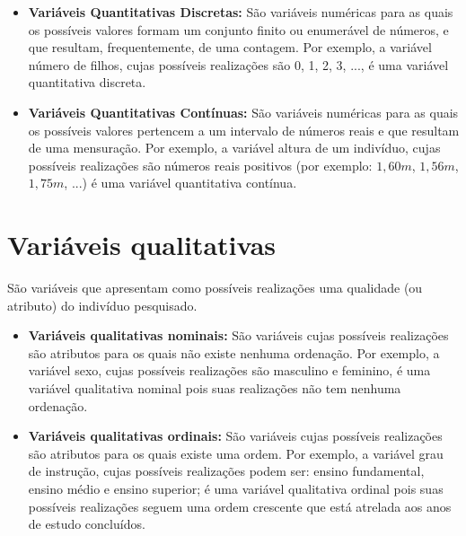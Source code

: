 \documentclass[11pt,fleqn]{book} %
\begin{document}
\begin{itemize}
	\item {\bf Variáveis Quantitativas Discretas:}
	São variáveis numéricas para as quais os possíveis valores formam um conjunto finito ou 
	enumerável de números, e que resultam, frequentemente, de uma contagem. Por exemplo, 
	a variável número de filhos, cujas possíveis realizações são 0, 1, 2, 3, $...$, é uma 
	variável quantitativa discreta.\\

	\item {\bf Variáveis Quantitativas Contínuas:}
	São variáveis numéricas para as quais os possíveis valores pertencem a um intervalo 
	de números reais e que resultam de uma mensuração. Por exemplo, a variável altura de 
	um indivíduo, cujas possíveis realizações são números reais positivos (por exemplo: 
	$1,60m$, $1,56m$, $1,75m$, $...$) é uma variável quantitativa contínua.\\
\end{itemize}


\section{Variáveis qualitativas}
São variáveis que apresentam como possíveis realizações uma qualidade (ou atributo) do indivíduo pesquisado.\\

\begin{itemize}
	\item {\bf Variáveis qualitativas nominais:} 
	São variáveis cujas possíveis realizações são atributos para os quais não existe nenhuma 
	ordenação. Por exemplo, a variável sexo, cujas possíveis realizações são masculino e 
	feminino, é uma variável qualitativa nominal pois suas realizações não tem nenhuma ordenação.\\

	\item {\bf Variáveis qualitativas ordinais:}
	São variáveis cujas possíveis realizações são atributos para os quais existe uma ordem. 
	Por exemplo, a variável grau de instrução, cujas possíveis realizações podem ser: ensino 
	fundamental, ensino médio e ensino superior; é uma variável qualitativa ordinal pois suas 
	possíveis realizações seguem uma ordem crescente que está atrelada aos anos de estudo concluídos.\\
\end{itemize}
\end{document}
